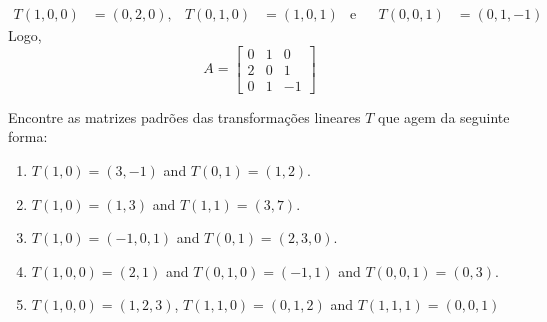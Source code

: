 \begin{resolution}
\begin{enumerate}[label=\alph*)]
          \begin{align}
            T(1,0,0) & = (0, 2, 0), &
            T(0,1,0) & = (1, 0, 1)  & \text{e} &  &
            T(0,0,1) & = (0, 1, -1)
          \end{align}
          Logo,
          \begin{equation}
            A = \begin{bmatrix}
              0 & 1 & 0  \\
              2 & 0 & 1  \\
              0 & 1 & -1
            \end{bmatrix}
          \end{equation}
  \end{enumerate}
\end{resolution}

\begin{question}
  Encontre as matrizes padrões das transformações lineares $T$ que agem da seguinte forma:
  \begin{enumerate}[label=\alph*)]
    \item $T(1, 0) = (3, -1)$ and $T(0, 1) = (1, 2)$.
    \item $T(1, 0) = (1, 3)$ and $T(1, 1) = (3, 7)$.
    \item $T(1, 0) = (-1, 0, 1)$ and $T(0, 1) = (2, 3, 0)$.
    \item $T(1,0,0) = (2, 1)$ and $T(0, 1, 0) = (-1, 1)$ and $T(0,0,1) = (0,3)$.
    \item $T(1,0,0) = (1, 2, 3)$, $T(1, 1, 0) = (0, 1, 2)$ and $T(1,1,1) = (0,0,1)$
  \end{enumerate}
\end{question}

